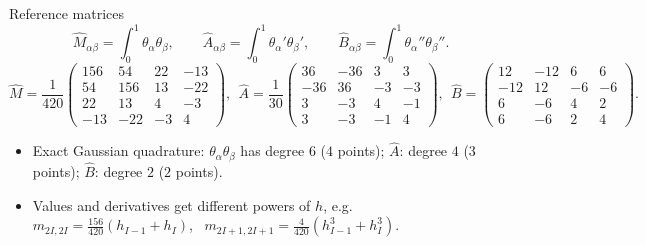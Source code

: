 \begin{frame}{Reference matrices}
    \[
        \widehat M_{\alpha\beta} = \int_0^1 \theta_\alpha\theta_\beta, \qquad
        \widehat A_{\alpha\beta} = \int_0^1 \theta_\alpha'\theta_\beta', \qquad
        \widehat B_{\alpha\beta} = \int_0^1 \theta_\alpha''\theta_\beta''.
    \]
    {\footnotesize\setlength{\arraycolsep}{3pt}
        \[
            \widehat M = \frac{1}{420}
            \begin{pmatrix}
                156 & 54  & 22 & -13 \\
                54  & 156 & 13 & -22 \\
                22  & 13  & 4  & -3  \\
                -13 & -22 & -3 & 4
            \end{pmatrix},
            \ \
            \widehat A = \frac{1}{30}
            \begin{pmatrix}
                36  & -36 & 3  & 3  \\
                -36 & 36  & -3 & -3 \\
                3   & -3  & 4  & -1 \\
                3   & -3  & -1 & 4
            \end{pmatrix},
            \ \
            \widehat B =
            \begin{pmatrix}
                12  & -12 & 6  & 6  \\
                -12 & 12  & -6 & -6 \\
                6   & -6  & 4  & 2  \\
                6   & -6  & 2  & 4
            \end{pmatrix}.
        \]
    }
    \begin{itemize}
        \item Exact Gaussian quadrature: $\theta_\alpha\theta_\beta$ has degree $6$ ($4$ points); $\widehat A$: degree $4$ ($3$ points); $\widehat B$: degree $2$ ($2$ points).
        \item Values and derivatives get different powers of $h$, e.g.\
              $m_{2I,2I} = \frac{156}{420}(h_{I-1} + h_I)$, \ $m_{2I+1,2I+1} = \frac{4}{420}(h_{I-1}^3 + h_I^3)$.
    \end{itemize}
\end{frame}

